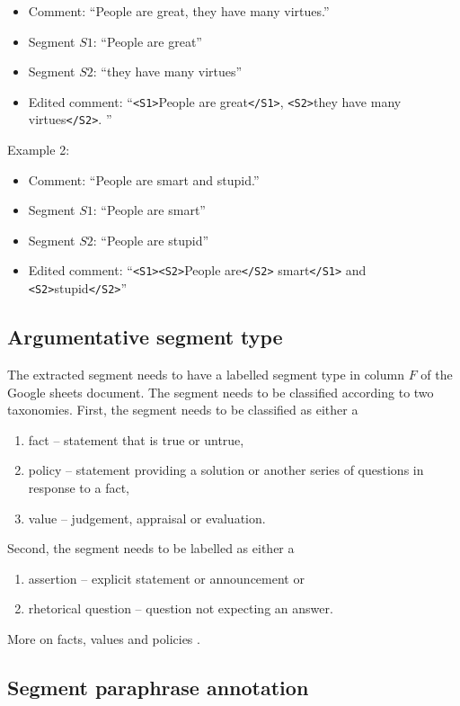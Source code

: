 \begin{itemize}
  \item[] Comment: ``People are great, they have many virtues.''
  \item[] Segment $S1$: ``People are great''
  \item[] Segment $S2$: ``they have many virtues''
  \item[] Edited comment: ``\texttt{<S1>}People are great\texttt{</S1>},
  \texttt{<S2>}they have many virtues\texttt{</S2>}. ''
\end{itemize}

\noindent Example 2:
\begin{itemize}
\item[] Comment: ``People are smart and stupid.''
\item[] Segment $S1$: ``People are smart''
\item[] Segment $S2$: ``People are stupid''
\item[] Edited comment: ``\texttt{<S1><S2>}People are\texttt{</S2>} smart\texttt{</S1>}
and \texttt{<S2>}stupid\texttt{</S2>}''
\end{itemize}

\subsection*{Argumentative segment type}

The extracted segment needs to have a labelled segment type in column $F$ of
the Google sheets document. The segment needs to be classified according to two
taxonomies. First, the segment needs to be classified as either a 
\begin{enumerate}
\item fact -- statement that is true or untrue,
\item policy -- statement providing a solution or another series of questions in response to a fact,
\item value -- judgement, appraisal or evaluation. 
\end{enumerate}
Second, the segment needs to be labelled as either a 
\begin{enumerate}
\item assertion -- explicit statement or announcement or
\item rhetorical question -- question not expecting an answer. 
\end{enumerate}
More on facts, values and policies \citep{factvaluepolicy}.

\subsection*{Segment paraphrase annotation}

